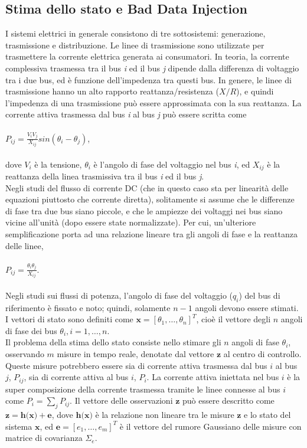 \subsection{Stima dello stato e Bad Data Injection}
I sistemi elettrici in generale consistono di tre sottosistemi: generazione, trasmissione e distribuzione. Le linee di trasmissione sono utilizzate per trasmettere la corrente elettrica generata ai consumatori. In teoria, la corrente complessiva trasmessa tra il bus \emph{i} ed il bus \emph{j} dipende dalla differenza di voltaggio tra i due bus, ed è funzione dell'impedenza tra questi bus. In genere, le linee di trasmissione hanno un alto rapporto reattanza/resistenza ($X/R$), e quindi l'impedenza di una trasmissione può essere approssimata con la sua reattanza. La corrente attiva trasmessa dal bus \emph{i} al bus \emph{j} può essere scritta come
\\
\\
\indent$P_{ij} = \frac{V_{i}V_{j}}{X_{ij}}sin(\theta_{i} - \theta_{j})$,
\\
\\
dove $V_{i}$ è la tensione, $\theta_{i}$ è l'angolo di fase del voltaggio nel bus \emph{i}, ed $X_{ij}$ è la reattanza della linea trasmissiva tra il bus \emph{i} ed il bus \emph{j}.\\
Negli studi del flusso di corrente DC (che in questo caso sta per linearità delle equazioni piuttosto che corrente diretta), solitamente si assume che le differenze di fase tra due bus siano piccole, e che le ampiezze dei voltaggi nei bus siano vicine all'unità (dopo essere state normalizzate). Per cui, un'ulteriore semplificazione porta ad una relazione lineare tra gli angoli di fase e la reattanza delle linee,
\\
\\
\indent$P_{ij} = \frac{\theta_{i}\theta_{j}}{X_{ij}}$.
\\
\\
Negli studi sui flussi di potenza, l'angolo di fase del voltaggio ($q_i$) del bus di riferimento è fissato e noto; quindi, solamente $n - 1$ angoli devono essere stimati. I vettori di stato sono definiti come $\textbf{x} = [\theta_1, \ldots, \theta_n]^T$, cioè il vettore degli $n$ angoli di fase dei bus $\theta_i, i = 1, \ldots, n$.\\
Il problema della stima dello stato consiste nello stimare gli $n$ angoli di fase $\theta_i$, osservando $m$ misure in tempo reale, denotate dal vettore $\textbf{z}$ al centro di controllo. Queste misure potrebbero essere sia di corrente attiva trasmessa dal bus $i$ al bus $j$, $P_{ij}$, sia di corrente attiva al bus $i$, $P_i$. La corrente attiva iniettata nel bus $i$ è la super composizione della corrente trasmessa tramite le linee connesse al bus $i$ come $P_i = \sum_j{P_{ij}}$. Il vettore delle osservazioni $\textbf{z}$ può essere descritto come $\textbf{z} = \textbf{h(x)} + \textbf{e}$, dove $\textbf{h(x)}$ è la relazione non lineare tra le misure $\textbf{z}$ e lo stato del sistema $\textbf{x}$, ed $\textbf{e} = [e_1, \ldots, e_m]^T$ è il vettore del rumore Gaussiano delle misure con matrice di covarianza $\Sigma_e$.\\

